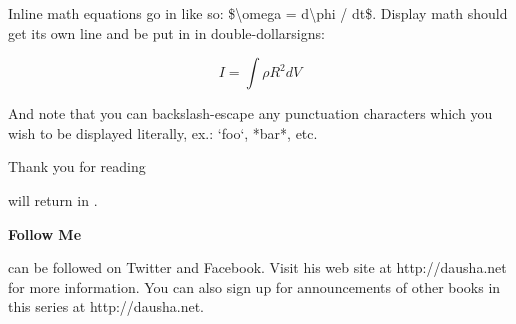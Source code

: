 \documentclass[11pt,twoside,makeidx,hidelinks,]{memoir}
\def\NextBook{}
\def\ReturningCharacters{}
\begin{document}
Inline math equations go in like so: \$\textbackslash{}omega = d\textbackslash{}phi / dt\$. Display
math should get its own line and be put in in double-dollarsigns:

\begin{displaymath}
I = \int \rho R^{2} dV
\end{displaymath}

And note that you can backslash-escape any punctuation characters
which you wish to be displayed literally, ex.: `foo`, *bar*, etc.



\backmatter

% 
\begin{center}
  \vspace*{\fill}

  {\Large \par
  \noindent Thank you for reading

  \vspace*{0.125in}
  {\LARGE\textbf{\textsf{\thetitle}}}
  \vspace*{0.125in}

  \ifdefined\ReturningCharacters
    \par
    \noindent\ReturningCharacters{} will return in \emph{\NextBook}.} \vspace*{\fill}
  \fi

  {\LARGE\textbf{\textsf{Follow Me}}}

  \vspace*{0.125in}

  \textbf{\theauthor{}} can be followed on Twitter and Facebook.
  \newline Visit his web site at http://dausha.net for more information. You can also sign up for announcements of other books in this series at http://dausha.net.

  \vspace*{\fill}
\end{center}
\end{document}

